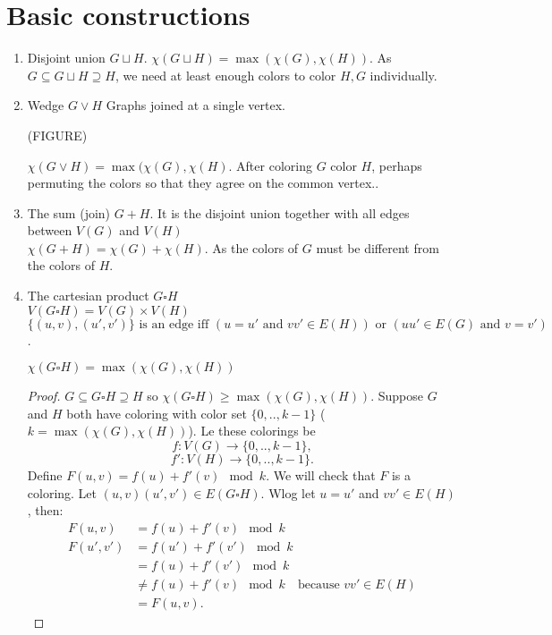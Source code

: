 \section{Basic constructions}
\begin{enumerate}
	\item Disjoint union $G \sqcup H$. $\chi(G \sqcup H)=\max(\chi(G),\chi(H))$. As $G\subseteq G \sqcup H \supseteq H$, we need at least enough colors to color $H,G$ individually.
	\item Wedge $G \vee H$ Graphs joined at a single vertex.

(FIGURE)

$\chi(G\vee H)=\max(\chi(G),\chi(H)$. After coloring $G$ color $H$, perhaps permuting the colors so that they agree on the common vertex..	
	
\item The sum (join) $G+H$. It is the disjoint union together with all edges between $V(G)$ and $V(H)$ \\
$\chi(G+H)=\chi(G)+\chi(H)$. As the colors of $G$ must be different from the colors of $H$.
\item The cartesian product $G \square H$ \\
$V(G \square H) = V(G) \times V(H)$ \\
$\{(u,v),(u',v')\} \text{ is an edge iff } (u=u' \text{ and } vv' \in E(H)) \text{ or } (uu' \in E(G) \text{ and } v=v')$. 

\begin{lemma} $\chi(G \square H)=\max(\chi(G),\chi(H))$
\end{lemma}
\begin{proof}
$G\subseteq G \square H \supseteq H$ so $\chi(G \square H) \geq \max(\chi(G),\chi(H))$. Suppose $G$ and $H$ both have coloring with color set $\{0,..,k-1\}$ ($k=\max(\chi(G), \chi(H))$). Le these colorings be 
$$
f: V(G) \rightarrow \{ 0,..,k-1\},
$$
$$
f': V(H) \rightarrow \{ 0,..,k-1 \}.
$$
Define $F(u,v)=f(u)+f'(v) \mod k$. We will check that $F$ is a coloring. Let $(u,v)(u',v') \in E(G \square H)$. Wlog let $u=u'$ and $vv' \in E(H)$, then:
\begin{align*}
	F(u,v) &=f(u)+f'(v) \mod k \\
	F(u',v') &=f(u')+f'(v') \mod k \\
	         &= f(u)+f'(v') \mod k \\
					&\neq f(u)+f'(v) \mod k  \quad \text{because } vv' \in E(H) \\
					&=F(u,v).
\end{align*}
\end{proof}

\end{enumerate}




